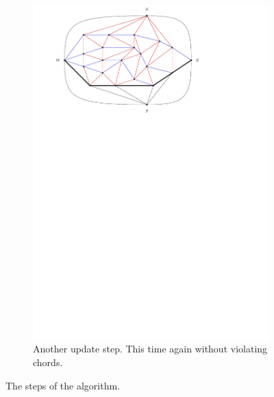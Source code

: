 \begin{figure}
    \begin{subfigure}[b]{.9 \textwidth}
      \includegraphics[width=\textwidth]{examples/img/smallExample/smallExample-6}
      \caption{Another update step. This time again without violating chords.}
      \label{fig:ex:simple:6}
    \end{subfigure}
    \caption{The steps of the algorithm.}
\end{figure}

